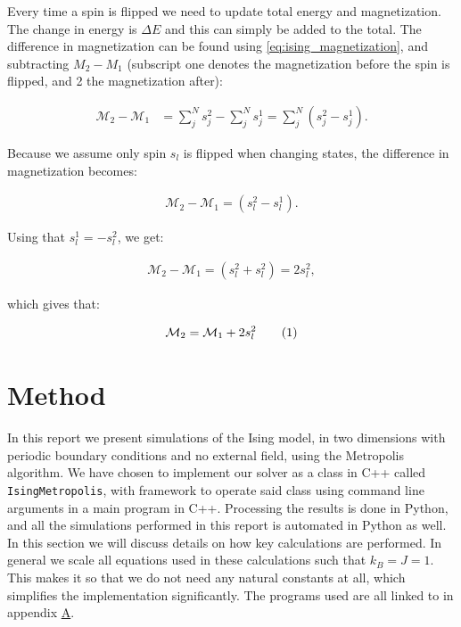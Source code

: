 \documentclass[reprint,english,notitlepage]{revtex4-1}  %
\newcommand\numberthis{\addtocounter{equation}{1}\tag{\theequation}}
\begin{document}
Every time a spin is flipped we need to update total energy and magnetization. The change in energy is $\Delta E$ and this can simply be added to the total. The difference in magnetization can be found using \eqref{eq:ising_magnetization}, and subtracting \(M_{2} - M_{1}\) (subscript one denotes the magnetization before the spin is flipped, and 2 the magnetization after): 

\begin{align*}
	\mathcal{M}_2 - \mathcal{M}_{1} &= \sum\limits_j^N s_j^{2} - \sum\limits_j^N s_j^{1} =
	\sum\limits_{j}^{N}\left(s_{j}^{2} - s_{j}^{1}\right).
\end{align*}

Because we assume only spin \(s_{l}\) is flipped when changing states, the difference in magnetization becomes:

\begin{align*}
 	\mathcal{M}_2 - \mathcal{M}_{1} = \left(s_{l}^{2} - s_{l}^{1}\right).
\end{align*} 

Using that \(s_{l}^{1} = - s_{l}^{2}\), we get:

\begin{align*}
	\mathcal{M}_2 - \mathcal{M}_{1} = \left(s_{l}^{2} + s_{l}^{2}\right) = 2s_{l}^{2},
\end{align*}

which gives that:

\begin{align*}
	\mathcal{M}_2 = \mathcal{M}_1 + 2s_{l}^{2} \numberthis \label{eq:delta_m}
\end{align*}


\newpage

\section{Method} \label{sec:III}

In this report we present simulations of the Ising model, in two dimensions with periodic boundary conditions and no external field, using the Metropolis algorithm. We have chosen to implement our solver as a class in C++ called \verb+IsingMetropolis+, with framework to operate said class using command line arguments in a main program in C++. Processing the results is done in Python, and all the simulations performed in this report is automated in Python as well. In this section we will discuss details on how key calculations are performed. In general we scale all equations used in these calculations such that $k_B = J = 1$. This makes it so that we do not need any natural constants at all, which simplifies the implementation significantly. The programs used are all linked to in appendix \hyperref[A]{A}.
\end{document}
